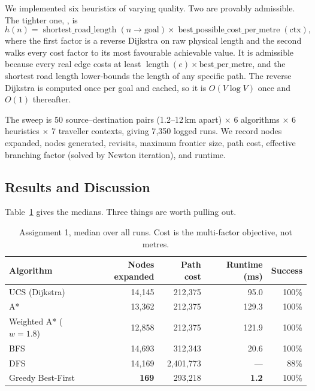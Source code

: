 \documentclass{ai-lab-report}
\begin{document}
We implemented six heuristics of varying quality. Two are provably admissible. The tighter
one, , is
\begin{equation}
h(n) = \operatorname{shortest\_road\_length}(n \to \text{goal}) \times
       \operatorname{best\_possible\_cost\_per\_metre}(\text{ctx}),
\end{equation}
where the first factor is a reverse Dijkstra on raw physical length and the second walks every
cost factor to its most favourable achievable value. It is admissible because every real edge
costs at least $\operatorname{length}(e) \times \text{best\_per\_metre}$, and the shortest road
length lower-bounds the length of any specific path. The reverse Dijkstra is computed once per
goal and cached, so it is $O(V \log V)$ once and $O(1)$ thereafter.

The sweep is 50 source--destination pairs (1.2--12\,km apart) $\times$ 6 algorithms $\times$
6 heuristics $\times$ 7 traveller contexts, giving 7{,}350 logged runs. We record nodes
expanded, nodes generated, revisits, maximum frontier size, path cost, effective branching
factor (solved by Newton iteration), and runtime.

\subsection{Results and Discussion}
Table~\ref{tab:a1} gives the medians. Three things are worth pulling out.

\begin{table}[H]
\centering
\caption{Assignment 1, median over all runs. Cost is the multi-factor objective, not metres.}
\label{tab:a1}
\begin{tabular}{lrrrr}
\toprule
Algorithm & Nodes expanded & Path cost & Runtime (ms) & Success \\
\midrule
UCS (Dijkstra)      & 14{,}145 & 212{,}375 & 95.0  & 100\% \\
A*                  & 13{,}362 & 212{,}375 & 129.3 & 100\% \\
Weighted A* ($w{=}1.8$) & 12{,}858 & 212{,}375 & 121.9 & 100\% \\
BFS                 & 14{,}693 & 312{,}343 & 20.6  & 100\% \\
DFS                 & 14{,}169 & 2{,}401{,}773 & --- & 88\% \\
Greedy Best-First   & \textbf{169} & 293{,}218 & \textbf{1.2} & 100\% \\
\bottomrule
\end{tabular}
\end{table}
\end{document}
